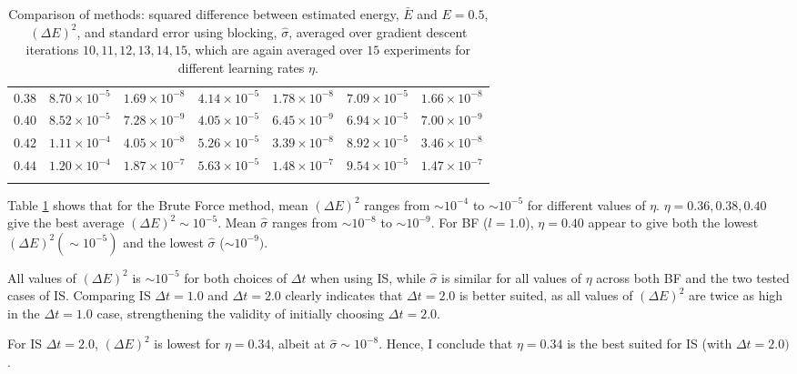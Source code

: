\documentclass[%
oneside,                 %
final,                   %
10pt]{article}
\begin{document}
\begin{table}[H]
\begin{center}
\begin{tabular}{l|l|l|l|l|l|l}
$ 0.38 $ &  $ 8.70\times 10^{-5 } $ & $ 1.69\times 10^{-8 } $ & $ 4.14\times 10^{-5 } $ & $ 1.78\times 10^{-8 } $ & $ 7.09\times 10^{-5 } $ & $ 1.66\times 10^{-8 } $  \\
$ 0.40 $ &  $ 8.52\times 10^{-5 } $ & $ 7.28\times 10^{-9 } $ & $ 4.05\times 10^{-5 } $ & $ 6.45\times 10^{-9 } $ & $ 6.94\times 10^{-5 } $ & $ 7.00\times 10^{-9 } $  \\
$ 0.42 $ &  $ 1.11\times 10^{-4 } $ & $ 4.05\times 10^{-8 } $ & $ 5.26\times 10^{-5 } $ & $ 3.39\times 10^{-8 } $ & $ 8.92\times 10^{-5 } $ & $ 3.46\times 10^{-8 } $  \\
$ 0.44 $ &  $ 1.20\times 10^{-4 } $ & $ 1.87\times 10^{-7 } $ & $ 5.63\times 10^{-5 } $ & $ 1.48\times 10^{-7 } $ & $ 9.54\times 10^{-5 } $ & $ 1.47\times 10^{-7 } $  \\
  \\
 \hline
\end{tabular}
\end{center}
\caption{Comparison of methods: squared difference between estimated energy, $\bar E$ and $E=0.5$, $(\Delta E)^2$, and standard error using blocking, $\hat \sigma$, averaged over gradient descent iterations $10,11,12,13,14,15$, which are again averaged over $15$ experiments for different learning rates $\eta$.}
\label{table:BF_IS_eta}
\end{table}

Table \ref{table:BF_IS_eta} shows that for the Brute Force method, mean $(\Delta E)^2$ ranges from $\sim 10^{-4}$ to $\sim 10^{-5}$ for different values of $\eta$. $\eta=0.36,0.38, 0.40$ give the best average $(\Delta E)^2 \sim 10^{-5}$. Mean $\hat \sigma$ ranges from $\sim 10^{-8}$ to $\sim 10^{-9}$. For BF ($l=1.0$), $\eta=0.40$ appear to give both the lowest $(\Delta E)^2 (\sim 10^{-5})$ and the lowest $\hat \sigma$ ($\sim 10^{-9})$. 

All values of  $(\Delta E)^2$ is $\sim 10^{-5}$ for both choices of $\Delta t$ when using IS, while $\hat \sigma$ is similar for all values of $\eta$ across both BF and the two tested cases of IS. 
Comparing IS $\Delta t=1.0$ and $\Delta t=2.0$ clearly indicates that $\Delta t=2.0$ is better suited, as all values of $(\Delta E)^2$ are twice as high in the $\Delta t=1.0$ case, strengthening the validity of initially choosing $\Delta t=2.0$.

For IS $\Delta t=2.0$, $(\Delta E)^2$ is lowest for $\eta=0.34$, albeit at $\hat \sigma\sim 10^{-8}$. Hence, I conclude that $\eta = 0.34$ is the best suited for IS (with $\Delta t=2.0)$.
\end{document}
